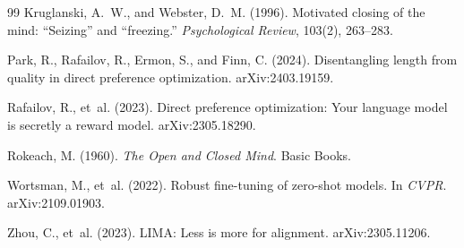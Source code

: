 \documentclass[11pt]{article}
\begin{document}
\begin{thebibliography}{99}
Kruglanski, A.~W., and Webster, D.~M. (1996). Motivated closing of the mind: ``Seizing'' and ``freezing.'' \emph{Psychological Review}, 103(2), 263--283.

Park, R., Rafailov, R., Ermon, S., and Finn, C. (2024). Disentangling length from quality in direct preference optimization. arXiv:2403.19159.

Rafailov, R., et~al. (2023). Direct preference optimization: Your language model is secretly a reward model. arXiv:2305.18290.

Rokeach, M. (1960). \emph{The Open and Closed Mind}. Basic Books.

Wortsman, M., et~al. (2022). Robust fine-tuning of zero-shot models. In \emph{CVPR}. arXiv:2109.01903.

Zhou, C., et~al. (2023). LIMA: Less is more for alignment. arXiv:2305.11206.

\end{thebibliography}
\end{document}
